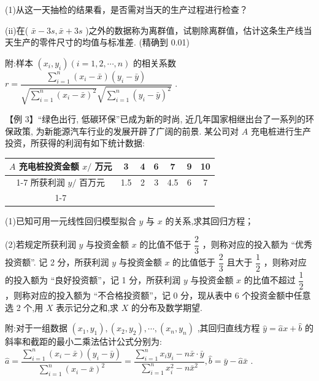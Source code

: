 (1)从这一天抽检的结果看，是否需对当天的生产过程进行检查？

(ii)在( $\bar{x} - {3s},\bar{x} + {3s}$ )之外的数据称为离群值，试剔除离群值，估计这条生产线当天生产的零件尺寸的均值与标准差. (精确到 0.01)

附:样本 $\left( {{x}_{i},{y}_{i}}\right) \left( {i = 1,2,\cdots ,n}\right)$ 的相关系数 $r = \dfrac{\mathop{\sum }\limits_{{i = 1}}^{n}\left( {{x}_{i} - \bar{x}}\right) \left( {{y}_{i} - \bar{y}}\right) }{\sqrt{\mathop{\sum }\limits_{{i = 1}}^{n}{\left( {x}_{i} - \bar{x}\right) }^{2}}\sqrt{\mathop{\sum }\limits_{{i = 1}}^{n}{\left( {y}_{i} - \bar{y}\right) }^{2}}}$ .

【例 3】“绿色出行, 低碳环保”已成为新的时尚, 近几年国家相继出台了一系列的环保政策, 为新能源汽车行业的发展开辟了广阔的前景. 某公司对 $A$ 充电桩进行生产投资，所获得的利润有如下统计数据:

\begin{center}
\begin{tabular}{|c|c|c|c|c|c|c|}
\hline
$A$ 充电桩投资金额 $x/$ 万元 & 3 & 4 & 6 & 7 & 9 & 10 \\
\cline{1-7}
所获利润 $y/$ 百万元 & 1.5 & 2 & 3 & 4.5 & 6 & 7 \\
\cline{1-7}
\hline
\end{tabular}
\end{center}

(1)已知可用一元线性回归模型拟合 $y$ 与 $x$ 的关系,求其回归方程；

(2)若规定所获利润 $y$ 与投资金额 $x$ 的比值不低于 $\dfrac{2}{3}$ ，则称对应的投入额为 “优秀投资额”. 记 2 分，所获利润 $y$ 与投资金额 $x$ 的比值低于 $\dfrac{2}{3}$ 且大于 $\dfrac{1}{2}$ ，则称对应的投入额为 “良好投资额”，记 1 分，所获利润 $y$ 与投资金额 $x$ 的比值不超过 $\dfrac{1}{2}$ ，则称对应的投入额为 “不合格投资额”，记 0 分，现从表中 6 个投资金额中任意选 2 个,用 $X$ 表示记分之和,求 $X$ 的分布及数学期望.

附:对于一组数据 $\left( {{x}_{1},{y}_{1}}\right) ,\left( {{x}_{2},{y}_{2}}\right) ,\cdots ,\left( {{x}_{n},{y}_{n}}\right)$ ,其回归直线方程 $\widehat{y} = \widehat{a}x + \widehat{b}$ 的斜率和截距的最小二乘法估计公式分别为: $\widehat{a} = \dfrac{\mathop{\sum }\limits_{{i = 1}}^{n}\left( {{x}_{i} - \bar{x}}\right) \left( {{y}_{i} - \bar{y}}\right) }{\mathop{\sum }\limits_{{i = 1}}^{n}{\left( {x}_{i} - \bar{x}\right) }^{2}} = \dfrac{\mathop{\sum }\limits_{{i = 1}}^{n}{x}_{i}{y}_{i} - n\bar{x} \cdot  \bar{y}}{\mathop{\sum }\limits_{{i = 1}}^{n}{x}_{i}^{2} - n{\bar{x}}^{2}},\widehat{b} = \bar{y} - \widehat{a}\bar{x}$ .

